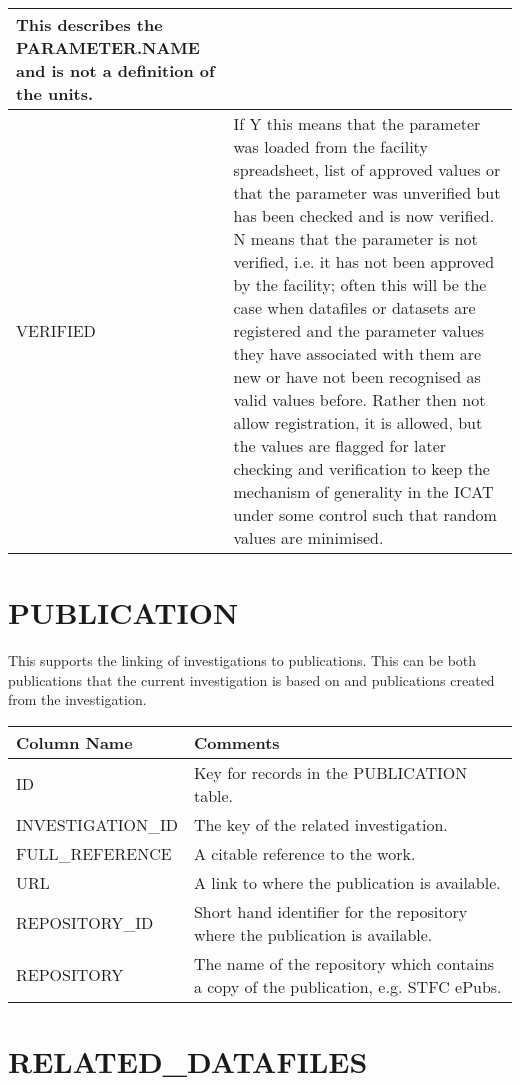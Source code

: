 \documentclass{report}
\begin{document}
\begin{tabular}{|l|l|}
{This describes the PARAMETER.NAME and is not a definition of the units.} \\ \hline
VERIFIED & \multicolumn{1}{p{100mm}|}{
If Y this means that the parameter was loaded from the facility spreadsheet, list of approved values or that the parameter was unverified but has been checked and is now verified. N means that the parameter is not verified, i.e. it has not been approved by the facility; often this will be the case when datafiles or datasets are registered and the parameter values they have associated with them are new or have not been recognised as valid values before. Rather then not allow registration, it is allowed, but the values are flagged for later checking and verification to keep the mechanism of generality in the ICAT under some control such that random values are minimised.} \\ \hline
\end{tabular}
\section{PUBLICATION}

This supports the linking of investigations to publications. This can be both publications that the current investigation is based on and publications created from the investigation.\\

\begin{tabular}{|l|l|}
\hline
Column Name & Comments \\ \hline
ID & \multicolumn{1}{p{100mm}|}{
Key for records in the PUBLICATION table.} \\ \hline
INVESTIGATION\_ID & \multicolumn{1}{p{100mm}|}{
The key of the related investigation.} \\ \hline
FULL\_REFERENCE & \multicolumn{1}{p{100mm}|}{
A citable reference to the work.} \\ \hline
URL & \multicolumn{1}{p{100mm}|}{
A link to where the publication is available.} \\ \hline
REPOSITORY\_ID & \multicolumn{1}{p{100mm}|}{
Short hand identifier for the repository where the publication is available.} \\ \hline
REPOSITORY & \multicolumn{1}{p{100mm}|}{
The name of the repository which contains a copy of the publication, e.g. STFC ePubs.} \\ \hline
\end{tabular}
\section{RELATED\_DATAFILES}
\end{document}
